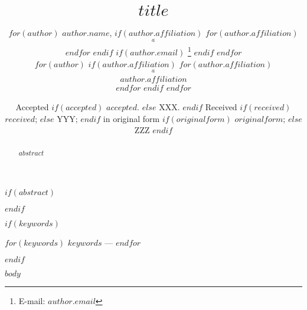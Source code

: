 \documentclass[a4paper,fleqn,usenatbib]{mnras}
\title[$shorttitle$]{$title$}
\author[$shortauthors$]{
$for(author)$
$author.name$,
$if(author.affiliation)$
$for(author.affiliation)$
$$^{a}$$
$endfor$
$endif$
$if(author.email)$
\thanks{E-mail: $author.email$}
$endif$
$endfor$
\\
$for(author)$
$if(author.affiliation)$
$for(author.affiliation)$
$$^{a}$$ $author.affiliation$\\
$endfor$
$endif$
$endfor$
}
\date{
Accepted 
$if(accepted)$
$accepted$.
$else$
XXX.
$endif$
Received
$if(received)$
$received$;
$else$
YYY;
$endif$
in original form
$if(originalform)$
$originalform$;
$else$
ZZZ
$endif$
}
\begin{document}
\label{firstpage}
\pagerange{\pageref{firstpage}--\pageref{lastpage}}
\maketitle

$if(abstract)$
\begin{abstract}
$abstract$
\end{abstract}
$endif$

$if(keywords)$
\begin{keywords}
$for(keywords)$
    $keywords$ --- 
$endfor$
\end{keywords}
$endif$

$body$
\end{document}
